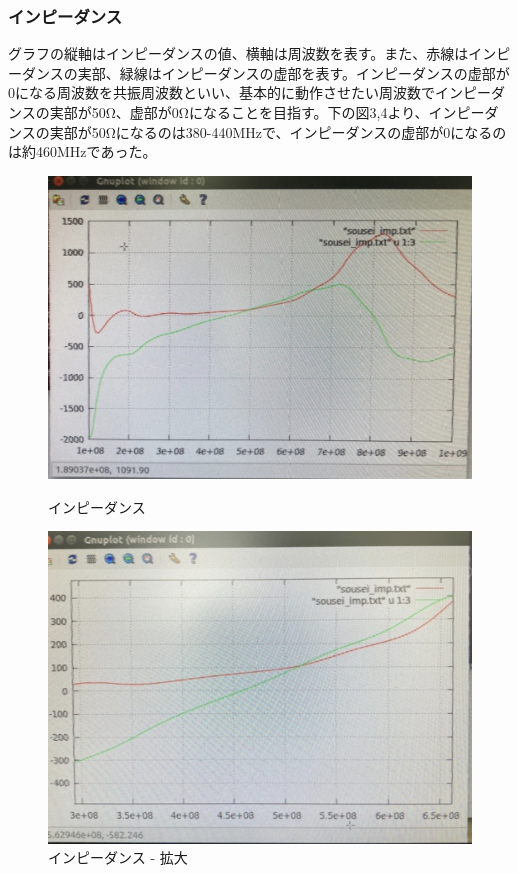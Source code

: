 \documentclass[dvipdfmx,autodetect-engine,titlepage]{jsarticle}
\begin{document}
\subsubsection{インピーダンス}
グラフの縦軸はインピーダンスの値、横軸は周波数を表す。また、赤線はインピーダンスの実部、緑線はインピーダンスの虚部を表す。インピーダンスの虚部が0になる周波数を共振周波数といい、基本的に動作させたい周波数でインピーダンスの実部が50Ω、虚部が0Ωになることを目指す。下の図3,4より、インピーダンスの実部が50Ωになるのは380-440MHzで、インピーダンスの虚部が0になるのは約460MHzであった。\\
\begin{figure}[H]
  \centering
  \begin{minipage}[b]{0.45\linewidth}
  \begin{center}
    \includegraphics[keepaspectratio,scale=0.17]{fg6.jpg}
    \end{center}
    \caption{インピーダンス}
  \end{minipage}
  \begin{minipage}[b]{0.45\linewidth}
  \begin{center}
    \includegraphics[keepaspectratio,scale=0.18]{fg7.jpg}
    \end{center}
    \caption{インピーダンス - 拡大}
  \end{minipage}
\end{figure}
\end{document}
